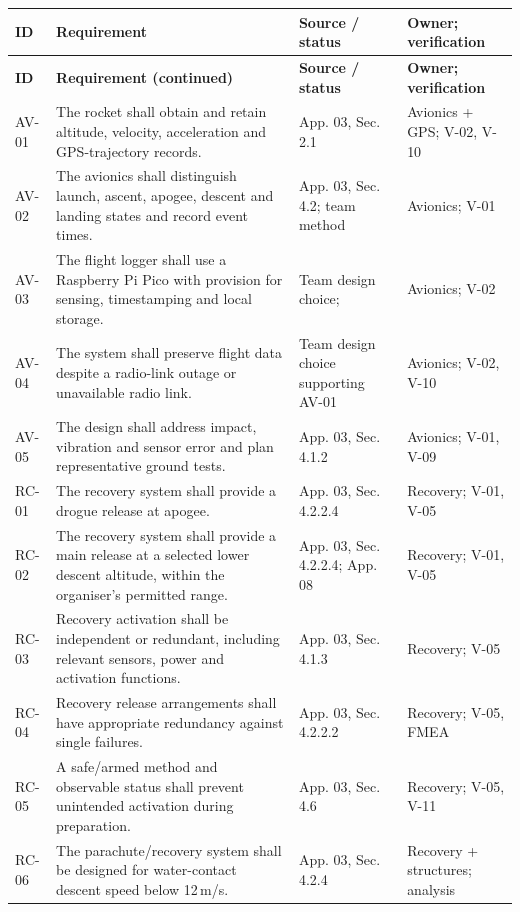 \footnotesize
{}
\begin{longtable}{@{}L{12mm}L{71mm}L{33mm}L{34mm}@{}}
\toprule{}\textbf{ID}&\textbf{Requirement}&\textbf{Source / status}&\textbf{Owner; verification}\\\midrule\endfirsthead
\toprule{}\textbf{ID}&\textbf{Requirement (continued)}&\textbf{Source / status}&\textbf{Owner; verification}\\\midrule\endhead
\bottomrule\endlastfoot
AV-01 & The rocket shall obtain and retain altitude, velocity, acceleration and GPS-trajectory records. & App. 03, Sec. 2.1 \cite{rtc2027app03} & Avionics + GPS; V-02, V-10\\
AV-02 & The avionics shall distinguish launch, ascent, apogee, descent and landing states and record event times. & App. 03, Sec. 4.2; team method & Avionics; V-01\\
AV-03 & The flight logger shall use a Raspberry Pi Pico with provision for sensing, timestamping and local storage. & Team design choice; \cite{picods} & Avionics; V-02\\
AV-04 & The system shall preserve flight data despite a radio-link outage or unavailable radio link. & Team design choice supporting AV-01 & Avionics; V-02, V-10\\
AV-05 & The design shall address impact, vibration and sensor error and plan representative ground tests. & App. 03, Sec. 4.1.2 \cite{rtc2027app03} & Avionics; V-01, V-09\\
RC-01 & The recovery system shall provide a drogue release at apogee. & App. 03, Sec. 4.2.2.4 & Recovery; V-01, V-05\\
RC-02 & The recovery system shall provide a main release at a selected lower descent altitude, within the organiser's permitted range. & App. 03, Sec. 4.2.2.4; App. 08 & Recovery; V-01, V-05\\
RC-03 & Recovery activation shall be independent or redundant, including relevant sensors, power and activation functions. & App. 03, Sec. 4.1.3 & Recovery; V-05\\
RC-04 & Recovery release arrangements shall have appropriate redundancy against single failures. & App. 03, Sec. 4.2.2.2 & Recovery; V-05, FMEA\\
RC-05 & A safe/armed method and observable status shall prevent unintended activation during preparation. & App. 03, Sec. 4.6 & Recovery; V-05, V-11\\
RC-06 & The parachute/recovery system shall be designed for water-contact descent speed below 12\,m/s. & App. 03, Sec. 4.2.4 & Recovery + structures; analysis\\

\end{longtable}
